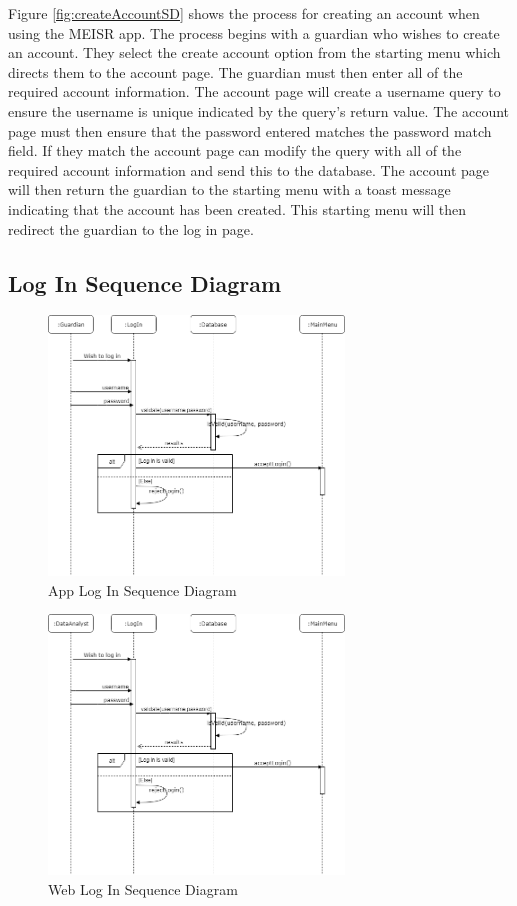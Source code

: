 	Figure \ref{fig:createAccountSD} shows the process for creating an account when using the MEISR app. The process begins with a guardian who wishes to create an account. They select the create account option from the starting menu which directs them to the account page. The guardian must then enter all of the required account information. The account page will create a username query to ensure the username is unique indicated by the query's return value. The account page must then ensure that the password entered matches the password match field. If they match the account page can modify the query with all of the required account information and send this to the database. The account page will then return the guardian to the starting menu with a toast message indicating that the account has been created. This starting menu will then redirect the guardian to the log in page.

\subsection{Log In Sequence Diagram}
\begin{figure}[H]
  \centering
  \includegraphics[width=0.7\textwidth]{images/LogInAppSequenceDiagram.png}
  \caption{App Log In Sequence Diagram}
  \label{fig:appLogInSD}
\end{figure}

\begin{figure}[H]
  \centering
  \includegraphics[width=0.7\textwidth]{images/LogInSequenceDiagram.png}
  \caption{Web Log In Sequence Diagram}
  \label{fig:webLogInSD}
\end{figure}

